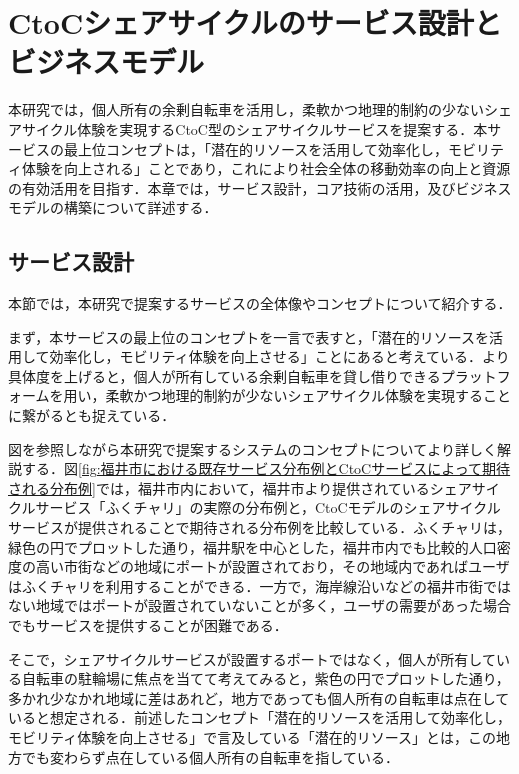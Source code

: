 \section{CtoCシェアサイクルのサービス設計とビジネスモデル}
  \label{sec:CtoCシェアサイクルのサービス設計とビジネスモデル}
    \par 本研究では，個人所有の余剰自転車を活用し，柔軟かつ地理的制約の少ないシェアサイクル体験を実現するCtoC型のシェアサイクルサービスを提案する．本サービスの最上位コンセプトは，「潜在的リソースを活用して効率化し，モビリティ体験を向上される」ことであり，これにより社会全体の移動効率の向上と資源の有効活用を目指す．本章では，サービス設計，コア技術の活用，及びビジネスモデルの構築について詳述する．
      
  \subsection{サービス設計}
    \label{sec:サービス設計}
      \par 本節では，本研究で提案するサービスの全体像やコンセプトについて紹介する．
      \par まず，本サービスの最上位のコンセプトを一言で表すと，「潜在的リソースを活用して効率化し，モビリティ体験を向上させる」ことにあると考えている．より具体度を上げると，個人が所有している余剰自転車を貸し借りできるプラットフォームを用い，柔軟かつ地理的制約が少ないシェアサイクル体験を実現することに繋がるとも捉えている．
      \par 図を参照しながら本研究で提案するシステムのコンセプトについてより詳しく解説する．図\ref{fig:福井市における既存サービス分布例とCtoCサービスによって期待される分布例}では，福井市内において，福井市より提供されているシェアサイクルサービス「ふくチャリ」の実際の分布例と，CtoCモデルのシェアサイクルサービスが提供されることで期待される分布例を比較している．ふくチャリは，緑色の円でプロットした通り，福井駅を中心とした，福井市内でも比較的人口密度の高い市街などの地域にポートが設置されており，その地域内であればユーザはふくチャリを利用することができる．一方で，海岸線沿いなどの福井市街ではない地域ではポートが設置されていないことが多く，ユーザの需要があった場合でもサービスを提供することが困難である．
      \par そこで，シェアサイクルサービスが設置するポートではなく，個人が所有している自転車の駐輪場に焦点を当てて考えてみると，紫色の円でプロットした通り，多かれ少なかれ地域に差はあれど，地方であっても個人所有の自転車は点在していると想定される．前述したコンセプト「潜在的リソースを活用して効率化し，モビリティ体験を向上させる」で言及している「潜在的リソース」とは，この地方でも変わらず点在している個人所有の自転車を指している．
